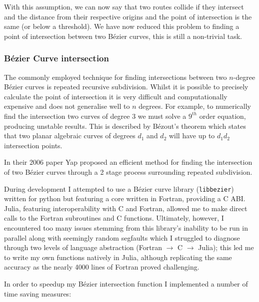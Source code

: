 With this assumption, we can now say that two routes collide if they intersect and the distance from their respective origins and the point of intersection is the same (or below a threshold). We have now reduced this problem to finding a point of intersection between two Bézier curves, this is still a non-trivial task.

\subsubsection{Bézier Curve intersection}

The commonly employed technique for finding intersections between two $n$-degree Bézier curves is repeated recursive subdivision. Whilst it is possible to precisely calculate the point of intersection it is very difficult and computationally expensive and does not generalise well to $n$ degrees. For example, to numerically find the intersection two curves of degree 3 we must solve a $9^{th}$ order equation, producing unstable results. This is described by Bézout's theorem which states that two planar algebraic curves of degrees $d_{1}$ and $d_{2}$ will have up to $d_{1}d_{2}$ intersection points.

In their 2006 paper Yap\cite{yapCompleteSubdivisionAlgorithms2006} proposed an efficient method for finding the intersection of two Bézier curves through a 2 stage process surrounding repeated subdivision.

During development I attempted to use a Bézier curve library (\texttt{libbezier})\cite{Hermes2017} written for python but featuring a core written in Fortran, providing a C ABI. Julia, featuring interoperability with C and Fortran, allowed me to make direct calls to the Fortran subroutines and C functions. Ultimately, however, I encountered too many issues stemming from this library's inability to be run in parallel along with seemingly random segfaults which I struggled to diagnose through two levels of language abstraction (Fortran $\rightarrow$ C $\rightarrow$ Julia); this led me to write my own functions natively in Julia, although replicating the same accuracy as the nearly 4000 lines of Fortran proved challenging.

In order to speedup my Bézier intersection function I implemented a number of time saving measures:

